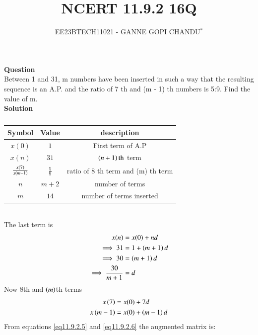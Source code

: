 \documentclass[journal,12pt,onecolumn]{IEEEtran}
\theoremstyle{remark}
\begin{document}

\vspace{3cm}
\title{NCERT 11.9.2 16Q}
\author{EE23BTECH11021 - GANNE GOPI CHANDU$^{*}$%
}
\maketitle
\bigskip
\renewcommand{\thefigure}{\theenumi}
\renewcommand{\thetable}{\theenumi}

\textbf{Question}\\
Between 1 and 31, m numbers have been inserted in such a way that the resulting sequence is an A.P. and 
the ratio of 7
th and (m - 1)
th numbers is 5:9. Find the value of m.\\
\textbf{Solution}\\
\begin{table}[!h]
\begin{center}
\renewcommand\thetable{1}
\begin{tabular}{ |c|c|c| } 
  \hline
    Symbol & Value & description \\ 
  \hline
  $x(0)$ & $1$ & First term of A.P  \\ 
  \hline
  $x(n)$ & $31$ & $\left(n+1\right)\text{th}$ term \\
  \hline
  $\frac{x\left(7\right)}{x\left(m-1\right)}$ & $\frac{5}{9}$ & ratio of 8 th term and (m) th term\\ 
  \hline
  $n$ & $m+2$ & number of terms \\
  \hline
  $m$ & $14$ & number of terms inserted \\
  \hline
\end{tabular}
\end{center}
\caption{}
\end{table}\\
The last term is
\begin{align}
x(n)&=x(0)+nd\\
\implies31 &= 1 + \left(m + 1\right)d \\
\implies30 &= \left(m + 1\right)d \\
\implies\frac{30}{m + 1} &= d \label{eq11.9.2.4}
\end{align}
Now $8$th and $\left(m\right)$th terms
\begin{align}
x\left(7\right) &= x(0) + 7d\label{eq11.9.2.5}\\
x\left(m-1\right) &= x(0) + \left(m-1\right)d\label{eq11.9.2.6}
\end{align}
From  equations \eqref{eq11.9.2.5} and \eqref{eq11.9.2.6} the augmented matrix is:\\
\end{document}
